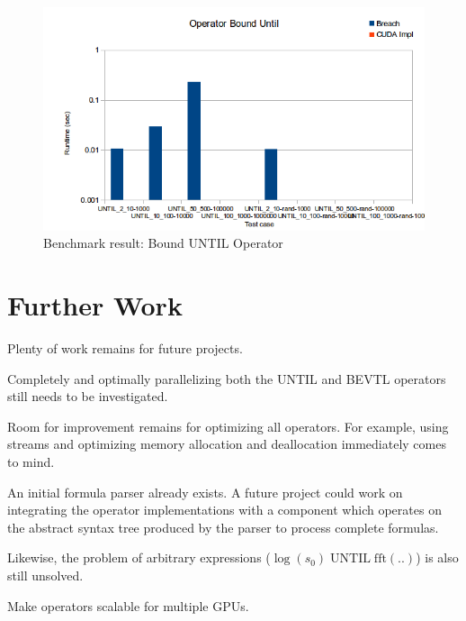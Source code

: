 \documentclass[a4paper,10pt]{article}
\begin{document}
\begin{figure}[H]
    \includegraphics[scale=0.5]{bm_buntil.png}
    \caption{
        \label{fig:bm_buntil}
        Benchmark result: Bound UNTIL Operator}
\end{figure}

\section{Further Work}

Plenty of work remains for future projects.

Completely and optimally parallelizing both the UNTIL and BEVTL operators still needs
to be investigated.

Room for improvement remains for optimizing all operators. For example, using streams
and optimizing memory allocation and deallocation immediately comes to mind.

An initial formula parser already exists. A future project could work on integrating the operator implementations with a component which operates on the abstract syntax tree produced by the parser to process complete formulas.

Likewise, the problem of arbitrary expressions ($\log(s_0) \; \text{UNTIL} \; \text{fft}(..)$) is also still unsolved.

Make operators scalable for multiple GPUs.
\end{document}
